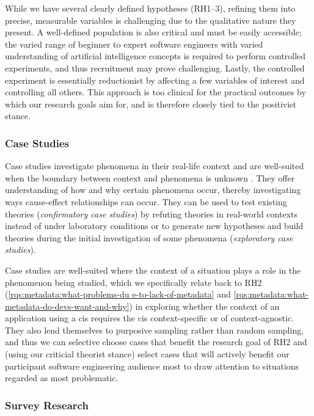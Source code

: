 While we have several clearly defined hypotheses (RH1--3), refining them into precise, measurable variables is challenging due to the qualitative nature they present. A well-defined population is also critical and must be easily accessible; the varied range of beginner to expert software engineers with varied understanding of artificial intelligence concepts is required to perform controlled experiments, and thus recruitment may prove challenging. Lastly, the controlled experiment is essentially reductionist by affecting a few variables of interest and controlling all others. This approach is too clinical for the practical outcomes by which our research goals aim for, and is therefore closely tied to the positivist stance.

\subsubsection{Case Studies}

Case studies investigate phenomena in their real-life context and are well-suited when the boundary between context and phenomena is unknown . They offer understanding of how and why certain phenomena occur, thereby investigating ways cause-effect relationships can occur. They can be used to test existing theories (\textit{confirmatory case studies}) by refuting theories in real-world contexts instead of under laboratory conditions or to generate new hypotheses and build theories during the initial investigation of some phenomena (\textit{exploratory case studies}).

Case studies are well-suited where the context of a situation plays a role in the phenomenon being studied, which we specifically relate back to RH2 (\ref{rqs:metadata:what-problems-du                                                                e-to-lack-of-metadata} and \ref{rqs:metadata:what-metadata-do-devs-want-and-why}) in exploring whether the context of an application using a \gls{cis} requires the \gls{cis} context-specific or of context-agnostic. They also lend themselves to purposive sampling rather than random sampling, and thus we can selective choose cases that benefit the research goal of RH2 and (using our criticial theorist stance) select cases that will actively benefit our participant software engineering audience most to draw attention to situations regarded as most problematic.

\subsubsection{Survey Research}

